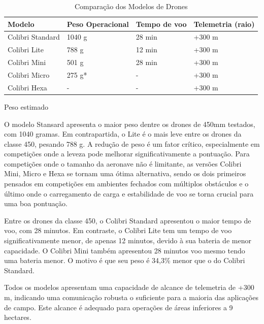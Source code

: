 \documentclass[conference]{IEEEtran}
\begin{document}
\begin{table}[htbp]
\centering
\caption{Comparação dos Modelos de Drones}
\label{tab:drone_comparison}
\begin{tabularx}{\columnwidth}{|l|X|X|X|}
\hline
\textbf{Modelo}         & \textbf{Peso Operacional} & \textbf{Tempo de voo} & \textbf{Telemetria (raio)} \\ \hline
Colibri Standard       & 1040 g                    & 28 min               & +300 m                     \\ \hline
Colibri Lite           & 788 g                     & 12 min               & +300 m                     \\ \hline
Colibri Mini           & 501 g                     & 28 min               & +300 m                     \\ \hline
Colibri Micro          & 275 g*                    & -                    & +300 m                     \\ \hline
Colibri Hexa           & -                         & -                    & +300 m                     \\ \hline
\end{tabularx}
\newline
\small *Peso estimado
\end{table}

O modelo Stansard apresenta o maior peso dentre os drones de 450mm testados, com 1040 gramas. Em contrapartida, o Lite é o mais leve entre os drones da classe 450, pesando 788 g. A redução de peso é um fator crítico, especialmente em competições onde a leveza pode melhorar significativamente a pontuação. Para competições onde o tamanho da aeronave não é limitante, as versões Colibri Mini, Micro e Hexa se tornam uma ótima alternativa, sendo os dois primeiros pensados em competições em ambientes fechados com múltiplos obstáculos e o último onde o carregamento de carga e estabilidade de voo se torna crucial para uma boa pontuação.

Entre os drones da classe 450, o Colibri Standard  apresentou o maior tempo de voo, com 28 minutos. Em contraste, o Colibri Lite tem um tempo de voo significativamente menor, de apenas 12 minutos, devido à sua bateria de menor capacidade. O Colibri Mini também apresentou 28 minutos voo mesmo tendo uma bateria menor. O motivo é que seu peso é 34,3\% menor que o do Colibri Standard. 

Todos os modelos apresentam uma capacidade de alcance de telemetria de +300 m, indicando uma comunicação robusta o suficiente para a maioria das aplicações de campo. Este alcance é adequado para operações de áreas inferiores a 9 hectares.
\end{document}
